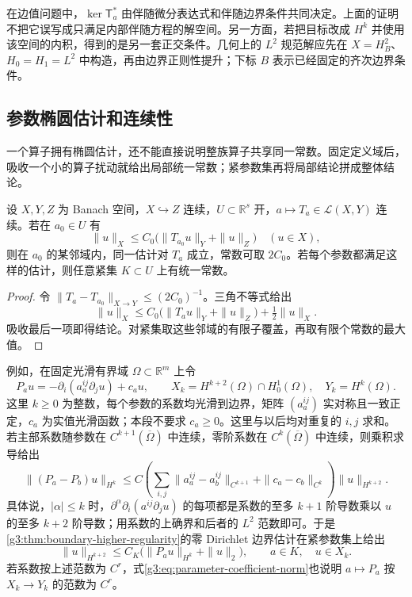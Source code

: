 在边值问题中，\(\ker\mathsf T_a^*\) 由伴随微分表达式和伴随边界条件共同决定。上面的证明不把它误写成只满足内部伴随方程的解空间。另一方面，若把目标改成 \(H^k\) 并使用该空间的内积，得到的是另一套正交条件。几何上的 \(L^2\) 规范解应先在 \(X=H^2_B\)、\(H_0=H_1=L^2\) 中构造，再由边界正则性提升；下标 \(B\) 表示已经固定的齐次边界条件。

\subsection{参数椭圆估计和连续性}
\label{g3:subsec:1404:02}
一个算子拥有椭圆估计，还不能直接说明整族算子共享同一常数。固定定义域后，吸收一个小的算子扰动就给出局部统一常数；紧参数集再将局部结论拼成整体结论。

\begin{proposition}\label{g3:prop:uniform-parameter-elliptic}
	设 \(X,Y,Z\) 为 Banach 空间，\(X\hookrightarrow Z\) 连续，\(U\subset\mathbb R^s\) 开，\(a\mapsto T_a\in\mathcal L(X,Y)\) 连续。若在 \(a_0\in U\) 有
	\[
		\|u\|_X\le C_0\bigl(\|T_{a_0}u\|_Y+\|u\|_Z\bigr)
		\quad(u\in X),
	\]
	则在 \(a_0\) 的某邻域内，同一估计对 \(T_a\) 成立，常数可取 \(2C_0\)。若每个参数都满足这样的估计，则任意紧集 \(K\subset U\) 上有统一常数。
\end{proposition}
\begin{proof}
	令 \(\|T_a-T_{a_0}\|_{X\to Y}\le(2C_0)^{-1}\)。三角不等式给出
	\[
		\|u\|_X\le C_0\bigl(\|T_au\|_Y+\|u\|_Z\bigr)
		+\tfrac12\|u\|_X.
	\]
	吸收最后一项即得结论。对紧集取这些邻域的有限子覆盖，再取有限个常数的最大值。
\end{proof}

例如，在固定光滑有界域 \(\Omega\subset\mathbb R^m\) 上令
\[
	P_au=-\partial_i(a_a^{ij}\partial_ju)+c_au,
	\qquad X_k=H^{k+2}(\Omega)\cap H^1_0(\Omega),\quad Y_k=H^k(\Omega).
\]
这里 \(k\ge0\) 为整数，每个参数的系数均光滑到边界，矩阵 \((a_a^{ij})\) 实对称且一致正定，\(c_a\) 为实值光滑函数；本段不要求 \(c_a\ge0\)。这里与以后均对重复的 \(i,j\) 求和。若主部系数随参数在 \(C^{k+1}(\overline\Omega)\) 中连续，零阶系数在 \(C^k(\overline\Omega)\) 中连续，则乘积求导给出
\begin{equation}\label{g3:eq:parameter-coefficient-norm}
	\|(P_a-P_b)u\|_{H^k}
	\le C\left(\sum_{i,j}\|a_a^{ij}-a_b^{ij}\|_{C^{k+1}}
	+\|c_a-c_b\|_{C^k}\right)\|u\|_{H^{k+2}}.
\end{equation}
具体说，\(|\alpha|\le k\) 时，\(\partial^\alpha\partial_i(a^{ij}\partial_ju)\) 的每项都是系数的至多 \(k+1\) 阶导数乘以 \(u\) 的至多 \(k+2\) 阶导数；用系数的上确界和后者的 \(L^2\) 范数即可。于是\cref{g3:thm:boundary-higher-regularity}的零 Dirichlet 边界估计在紧参数集上给出
\begin{equation}\label{g3:eq:uniform-dirichlet-estimate}
	\|u\|_{H^{k+2}}\le C_K
	\bigl(\|P_au\|_{H^k}+\|u\|_2\bigr),\qquad a\in K,\quad u\in X_k.
\end{equation}
若系数按上述范数为 \(C^r\)，式\eqref{g3:eq:parameter-coefficient-norm}也说明 \(a\mapsto P_a\) 按 \(X_k\to Y_k\) 的范数为 \(C^r\)。

